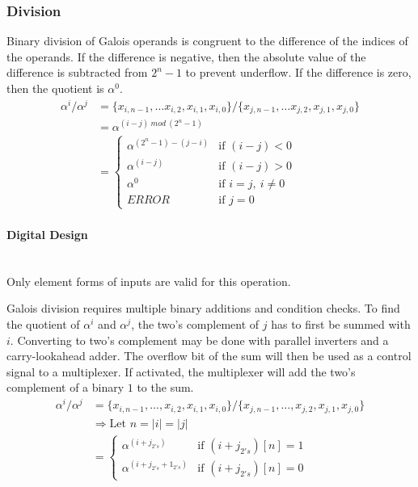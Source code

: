 \subsubsection{Division} Binary division of Galois operands is congruent to the
difference of the indices of the operands. If the difference is negative, then
the absolute value of the difference is subtracted from $2^{n}-1$ to prevent
underflow. If the difference is zero, then the quotient is $\alpha^{0}$.
    \begin{align*}
        \alpha^{i} / \alpha^{j} & = \{x_{i, n-1},\ldots x_{i, 2},x_{i,
        1},x_{i, 0}\} / \{x_{j, n-1}, \ldots x_{j, 2}, x_{j, 1}, x_{j, 0}\}
        \\
        & = \alpha^{(i - j) \ mod \ (2^{n}-1)} \\
        & = \begin{cases}
            \alpha^{(2^{n}-1) - (j - i)} & \text{if $(i - j) < 0$} \\
            \alpha^{(i - j)} & \text{if $(i - j) > 0$} \\
            \alpha^{0} & \text{if $i = j, \ i \neq 0$} \\
            ERROR & \text{if $j = 0$}
        \end{cases}
    \end{align*}

    \paragraph{{\small Digital Design}} \leavevmode \\ Only element forms of
    inputs are valid for this operation.

    Galois division requires multiple binary additions and condition checks. To
    find the quotient of $\alpha^{i}$ and $\alpha^{j}$, the two's complement of
    $j$ has to first be summed with $i$. Converting to two's complement may be
    done with parallel inverters and a carry-lookahead adder. The overflow bit
    of the sum will then be used as a control signal to a multiplexer. If
    activated, the multiplexer will add the two's complement of a binary $1$ to
    the sum.
\begin{align*}
    \alpha^{i} / \alpha^{j} & = \{ x_{i, n-1}, \ldots, x_{i, 2}, x_{i, 1},
    x_{i, 0} \} / \{x_{j, n-1}, \ldots, x_{j, 2}, x_{j, 1}, x_{j, 0}\} \\
    & \Longrightarrow \text{Let } n = |i| = |j| \\
    & = \begin{cases}
            \alpha^{(i + j_{2's})} & \text{if $(i+j_{2's})[n]=1$} \\
            \alpha^{(i + j_{2's} + 1_{2's})} & \text{if $(i+j_{2's})[n]=0$}
        \end{cases}
\end{align*}

